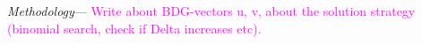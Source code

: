 \documentclass[aps,twocolumn,amsmath,amssymb,preprintnumbers,floatfix,prl,superscriptaddress,longbibliography]{revtex4-2}%
\newcommand{\hans}[1]{\textcolor{Magenta}{{#1}}}
\begin{document}
\textit{Methodology}---
\hans{Write about BDG-vectors u, v, about the solution strategy (binomial search, check if Delta increases etc).}

\end{document}
